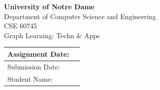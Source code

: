 \documentclass[11pt]{article}
\begin{document}
\thispagestyle{fancy}
\vspace*{2.2cm}
\begin{center}
  {\Huge\bfseries\sffamily University of Notre Dame}\\[0.9em]
  {\LARGE Department of Computer Science and Engineering}\\[3.2em]
  {\LARGE CSE 60745}\\[0.7em]
  {\LARGE Graph Learning: Techn \& Apps}\\[3.2em]

  \begin{tabular}{|p{5cm}|p{7cm}|}
    \hline
    \rule{0pt}{3.2em}\hfill Assignment Date: & \\[1.1em]
    \hline
    \rule{0pt}{3.2em}\hfill Submission Date: & \\[1.1em]
    \hline
    \rule{0pt}{3.2em}\hfill Student Name: & \\[1.1em]
    \hline
  \end{tabular}
\end{center}

\newpage





\label{LastPage}
\end{document}
